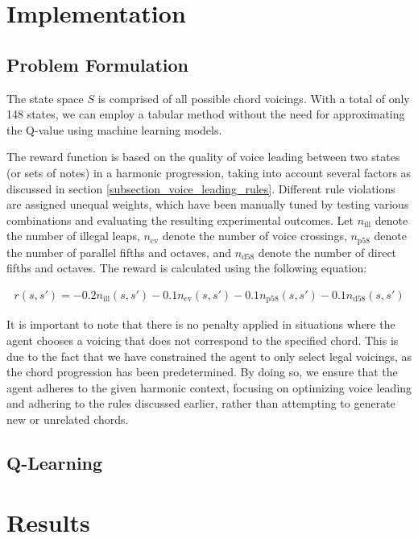 \documentclass[12pt, letterpaper]{article}
\begin{document}
\section{Implementation}

\subsection{Problem Formulation}

The state space $S$ is comprised of all possible chord voicings. With a total of only 148 states, we can employ a tabular method without the need for approximating the Q-value using machine learning models.

The reward function is based on the quality of voice leading between two states (or sets of notes) in a harmonic progression, taking into account several factors as discussed in section \ref{subsection_voice_leading_rules}. Different rule violations are assigned unequal weights, which have been manually tuned by testing various combinations and evaluating the resulting experimental outcomes. Let $n_\text{ill}$ denote the number of illegal leaps, $n_\text{cv}$ denote the number of voice crossings, $n_\text{p58}$ denote the number of parallel fifths and octaves, and $n_\text{d58}$ denote the number of direct fifths and octaves. The reward is calculated using the following equation:

\begin{align}
    r(s, s') = -0.2n_\text{ill}(s, s') - 0.1n_\text{cv}(s, s') - 0.1n_\text{p58}(s, s') -0.1n_\text{d58}(s, s')
\end{align}

It is important to note that there is no penalty applied in situations where the agent chooses a voicing that does not correspond to the specified chord. This is due to the fact that we have constrained the agent to only select legal voicings, as the chord progression has been predetermined. By doing so, we ensure that the agent adheres to the given harmonic context, focusing on optimizing voice leading and adhering to the rules discussed earlier, rather than attempting to generate new or unrelated chords.

\subsection{Q-Learning}

\section{Results}
\end{document}
